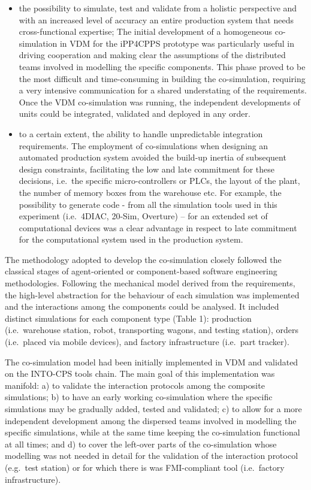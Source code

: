 \begin{itemize}
\item the possibility to simulate, test and validate from a holistic perspective and with an increased level of accuracy an entire production system that needs cross-functional expertise; The initial development of a homogeneous co-simulation in VDM for the iPP4CPPS prototype was particularly useful in driving cooperation and making clear the assumptions of the distributed teams involved in modelling the specific components. This phase proved to be the most difficult and time-consuming in building the co-simulation, requiring a very intensive communication for a shared understating of the requirements. Once the VDM co-simulation was running, the independent developments of units could be integrated, validated and deployed in any order.
\item to a certain extent, the ability to handle unpredictable integration requirements. The employment of co-simulations when designing an automated production system avoided the build-up inertia of subsequent design constraints, facilitating the low and late commitment for these decisions, i.e.\ the specific micro-controllers or PLCs, the layout of the plant, the number of memory boxes from the warehouse etc. For example, the possibility to generate code - from all the simulation tools used in this experiment (i.e.\ 4DIAC, 20-Sim, Overture) -- for an extended set of computational devices was a clear advantage in respect to late commitment for the computational system used in the production system.
\end{itemize}

The methodology adopted to develop the co-simulation closely followed the classical stages of agent-oriented or component-based software engineering methodologies. Following the mechanical model derived from the requirements, the high-level abstraction for the behaviour of each simulation was implemented and the interactions among the components could be analysed. It included distinct simulations for each component type (Table 1): production (i.e.\ warehouse station, robot, transporting wagons, and testing station), orders (i.e.\ placed via mobile devices), and factory infrastructure (i.e.\ part tracker).

The co-simulation model had been initially implemented in VDM and validated on the INTO-CPS tools chain. The main goal of this implementation was manifold: a) to validate the interaction protocols among the composite simulations; b) to have an early working co-simulation where the specific simulations may be gradually added, tested and validated; c) to allow for a more independent development among the dispersed teams involved in modelling the specific simulations, while at the same time keeping the co-simulation functional at all times; and d) to cover the left-over parts of the co-simulation whose modelling was not needed in detail for the validation of the interaction protocol (e.g.\ test station) or for which there is was FMI-compliant tool (i.e.\ factory infrastructure).

